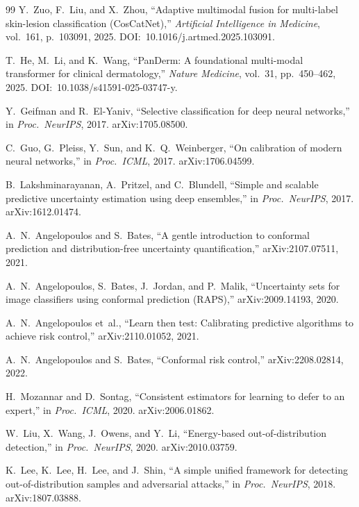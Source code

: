 \documentclass[conference]{IEEEtran}
\newcommand{\1}{\mathbf{1}}
\begin{document}
\begin{thebibliography}{99}
Y.~Zuo, F.~Liu, and X.~Zhou,
``Adaptive multimodal fusion for multi-label skin-lesion classification (CosCatNet),''
\emph{Artificial Intelligence in Medicine}, vol.~161, p.~103091, 2025. DOI:~10.1016/j.artmed.2025.103091.

T.~He, M.~Li, and K.~Wang,
``PanDerm: A foundational multi-modal transformer for clinical dermatology,''
\emph{Nature Medicine}, vol.~31, pp.~450--462, 2025. DOI:~10.1038/s41591-025-03747-y.

Y.~Geifman and R.~El-Yaniv,
``Selective classification for deep neural networks,''
in \emph{Proc.\ NeurIPS}, 2017. arXiv:1705.08500.

C.~Guo, G.~Pleiss, Y.~Sun, and K.~Q.~Weinberger,
``On calibration of modern neural networks,''
in \emph{Proc.\ ICML}, 2017. arXiv:1706.04599.

B.~Lakshminarayanan, A.~Pritzel, and C.~Blundell,
``Simple and scalable predictive uncertainty estimation using deep ensembles,''
in \emph{Proc.\ NeurIPS}, 2017. arXiv:1612.01474.

A.~N.~Angelopoulos and S.~Bates,
``A gentle introduction to conformal prediction and distribution-free
uncertainty quantification,''
arXiv:2107.07511, 2021.

A.~N.~Angelopoulos, S.~Bates, J.~Jordan, and P.~Malik,
``Uncertainty sets for image classifiers using conformal prediction (RAPS),''
arXiv:2009.14193, 2020.

A.~N.~Angelopoulos et~al.,
``Learn then test: Calibrating predictive algorithms to achieve risk control,''
arXiv:2110.01052, 2021.

A.~N.~Angelopoulos and S.~Bates,
``Conformal risk control,''
arXiv:2208.02814, 2022.

H.~Mozannar and D.~Sontag,
``Consistent estimators for learning to defer to an expert,''
in \emph{Proc.\ ICML}, 2020. arXiv:2006.01862.

W.~Liu, X.~Wang, J.~Owens, and Y.~Li,
``Energy-based out-of-distribution detection,''
in \emph{Proc.\ NeurIPS}, 2020. arXiv:2010.03759.

K.~Lee, K.~Lee, H.~Lee, and J.~Shin,
``A simple unified framework for detecting out-of-distribution samples
and adversarial attacks,''
in \emph{Proc.\ NeurIPS}, 2018. arXiv:1807.03888.


\end{thebibliography}
\end{document}
